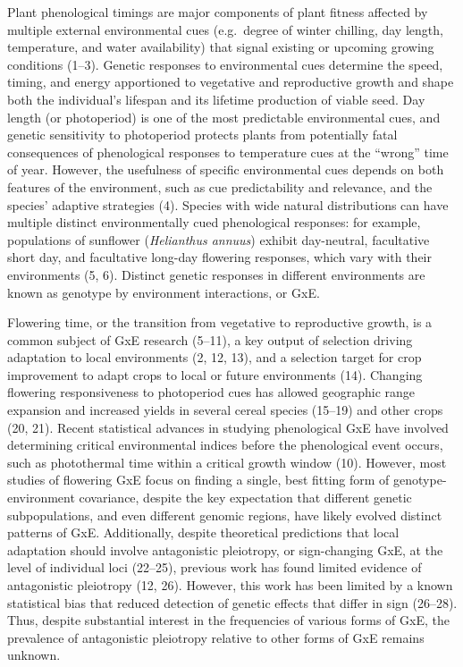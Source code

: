 \documentclass[
  9pt,
  twocolumn,
  twoside]{pnas-new}
\begin{document}
Plant phenological timings are major components of plant fitness
affected by multiple external environmental cues (e.g.~degree of winter
chilling, day length, temperature, and water availability) that signal
existing or upcoming growing conditions (1--3). Genetic responses to
environmental cues determine the speed, timing, and energy apportioned
to vegetative and reproductive growth and shape both the individual's
lifespan and its lifetime production of viable seed. Day length (or
photoperiod) is one of the most predictable environmental cues, and
genetic sensitivity to photoperiod protects plants from potentially
fatal consequences of phenological responses to temperature cues at the
``wrong'' time of year. However, the usefulness of specific
environmental cues depends on both features of the environment, such as
cue predictability and relevance, and the species' adaptive strategies
(4). Species with wide natural distributions can have multiple distinct
environmentally cued phenological responses: for example, populations of
sunflower (\emph{Helianthus annuus}) exhibit day-neutral, facultative
short day, and facultative long-day flowering responses, which vary with
their environments (5, 6). Distinct genetic responses in different
environments are known as genotype by environment interactions, or GxE.

Flowering time, or the transition from vegetative to reproductive
growth, is a common subject of GxE research (5--11), a key output of
selection driving adaptation to local environments (2, 12, 13), and a
selection target for crop improvement to adapt crops to local or future
environments (14). Changing flowering responsiveness to photoperiod cues
has allowed geographic range expansion and increased yields in several
cereal species (15--19) and other crops (20, 21). Recent statistical
advances in studying phenological GxE have involved determining critical
environmental indices before the phenological event occurs, such as
photothermal time within a critical growth window (10). However, most
studies of flowering GxE focus on finding a single, best fitting form of
genotype-environment covariance, despite the key expectation that
different genetic subpopulations, and even different genomic regions,
have likely evolved distinct patterns of GxE. Additionally, despite
theoretical predictions that local adaptation should involve
antagonistic pleiotropy, or sign-changing GxE, at the level of
individual loci (22--25), previous work has found limited evidence of
antagonistic pleiotropy (12, 26). However, this work has been limited by
a known statistical bias that reduced detection of genetic effects that
differ in sign (26--28). Thus, despite substantial interest in the
frequencies of various forms of GxE, the prevalence of antagonistic
pleiotropy relative to other forms of GxE remains unknown.
\end{document}
